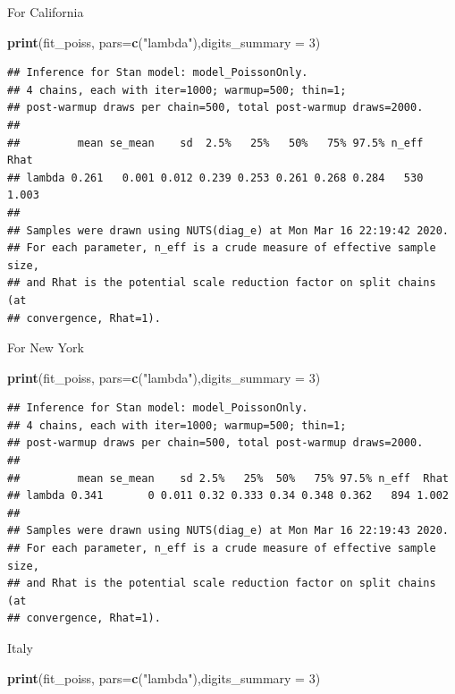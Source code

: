 \documentclass[]{article}
\newenvironment{Shaded}{\begin{snugshade}}{\end{snugshade}}
\newcommand{\DataTypeTok}[1]{\textcolor[rgb]{0.13,0.29,0.53}{#1}}
\newcommand{\DecValTok}[1]{\textcolor[rgb]{0.00,0.00,0.81}{#1}}
\newcommand{\KeywordTok}[1]{\textcolor[rgb]{0.13,0.29,0.53}{\textbf{#1}}}
\newcommand{\NormalTok}[1]{#1}
\newcommand{\StringTok}[1]{\textcolor[rgb]{0.31,0.60,0.02}{#1}}
\begin{document}
For California

\begin{Shaded}
\begin{Highlighting}[]
\KeywordTok{print}\NormalTok{(fit_poiss, }\DataTypeTok{pars=}\KeywordTok{c}\NormalTok{(}\StringTok{"lambda"}\NormalTok{),}\DataTypeTok{digits_summary =} \DecValTok{3}\NormalTok{)}
\end{Highlighting}
\end{Shaded}

\begin{verbatim}
## Inference for Stan model: model_PoissonOnly.
## 4 chains, each with iter=1000; warmup=500; thin=1; 
## post-warmup draws per chain=500, total post-warmup draws=2000.
## 
##         mean se_mean    sd  2.5%   25%   50%   75% 97.5% n_eff  Rhat
## lambda 0.261   0.001 0.012 0.239 0.253 0.261 0.268 0.284   530 1.003
## 
## Samples were drawn using NUTS(diag_e) at Mon Mar 16 22:19:42 2020.
## For each parameter, n_eff is a crude measure of effective sample size,
## and Rhat is the potential scale reduction factor on split chains (at 
## convergence, Rhat=1).
\end{verbatim}

For New York

\begin{Shaded}
\begin{Highlighting}[]
\KeywordTok{print}\NormalTok{(fit_poiss, }\DataTypeTok{pars=}\KeywordTok{c}\NormalTok{(}\StringTok{"lambda"}\NormalTok{),}\DataTypeTok{digits_summary =} \DecValTok{3}\NormalTok{)}
\end{Highlighting}
\end{Shaded}

\begin{verbatim}
## Inference for Stan model: model_PoissonOnly.
## 4 chains, each with iter=1000; warmup=500; thin=1; 
## post-warmup draws per chain=500, total post-warmup draws=2000.
## 
##         mean se_mean    sd 2.5%   25%  50%   75% 97.5% n_eff  Rhat
## lambda 0.341       0 0.011 0.32 0.333 0.34 0.348 0.362   894 1.002
## 
## Samples were drawn using NUTS(diag_e) at Mon Mar 16 22:19:43 2020.
## For each parameter, n_eff is a crude measure of effective sample size,
## and Rhat is the potential scale reduction factor on split chains (at 
## convergence, Rhat=1).
\end{verbatim}

Italy

\begin{Shaded}
\begin{Highlighting}[]
\KeywordTok{print}\NormalTok{(fit_poiss, }\DataTypeTok{pars=}\KeywordTok{c}\NormalTok{(}\StringTok{"lambda"}\NormalTok{),}\DataTypeTok{digits_summary =} \DecValTok{3}\NormalTok{)}
\end{Highlighting}
\end{Shaded}
\end{document}
